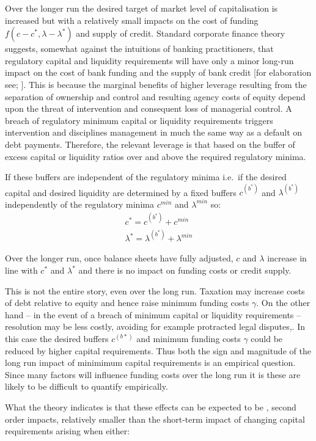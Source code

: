 \documentclass[
  12,
]{article}
\begin{document}
Over the longer run the desired target of market level of capitalisation is increased but with a relatively small impacts on the cost of funding \(f(c-c^\ast,\lambda-\lambda^\ast)\) and supply of credit. Standard corporate finance theory suggests, somewhat against the intuitions of banking practitioners, that regulatory capital and liquidity requirements will have only a minor long-run impact on the cost of bank funding and the supply of bank credit {[}for elaboration see; \citet{hellwig2014bankers}{]}. This is because the marginal benefits of higher leverage resulting from the separation of ownership and control and resulting agency costs of equity depend upon the threat of intervention and consequent loss of managerial control. A breach of regulatory minimum capital or liquidity requirements triggers intervention and disciplines management in much the same way as a default on debt payments. Therefore, the relevant leverage is that based on the buffer of excess capital or liquidity ratios over and above the required regulatory minima.

If these buffers are independent of the regulatory minima i.e.~if the desired capital and desired liquidity are determined by a fixed buffers \(c^{(b^*)}\) and \(\lambda^{(b^*)}\) independently of the regulatory minima \(c^{min}\) and \(\lambda^{min}\) so:
\[
\begin{split}
c^*=c^{(b^*)}+c^{min} \\
\lambda^\ast=\lambda^{(b^*)}+\lambda^{min} 
\end{split}
\]

Over the longer run, once balance sheets have fully adjusted, \(c\) and \(\lambda\) increase in line with \(c^\ast\) and \(\lambda^\ast\) and there is no impact on funding costs or credit supply.

This is not the entire story, even over the long run. Taxation may increase costs of debt relative to equity and hence raise minimum funding costs \(\gamma\). On the other hand -- in the event of a breach of minimum capital or liquidity requirements -- resolution may be less costly, avoiding for example protracted legal disputes,. In this case the desired buffers \(c^(b*)\) and minimum funding costs \(\gamma\) could be reduced by higher capital requirements. Thus both the sign and magnitude of the long run impact of minimimum capital requirements is an empirical question. Since many factors will influence funding costs over the long run it is these are likely to be difficult to quantify empirically.

What the theory indicates is that these effects can be expected to be , second order impacts, relatively smaller than the short-term impact of changing capital requirements arising when either:
\end{document}
